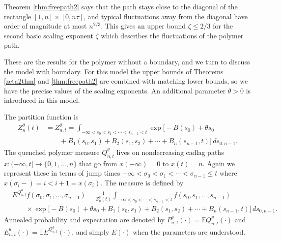\documentclass[11pt]{amsart}
\numberwithin{equation}{section}
\theoremstyle{remark}
\begin{document}
Theorem \ref{thm:freepath2} says that the path   stays close to the diagonal of the rectangle
$[1,n]\times[0,n\tau]$, and typical  fluctuations away from the diagonal have order of
magnitude at most $n^{2/3}$.  This gives an upper bound $\zeta\le 2/3$ for the second
basic scaling exponent $\zeta$  which describes the fluctuations of the polymer path. 

\medskip

These are the results for the polymer without a boundary, and we turn to discuss
the model with boundary.  For this model the upper bounds of Theorems 
\ref{zeta2thm} and \ref{thm:freepath2} are combined with matching lower bounds,
so we have the precise values of the scaling exponents.    An additional 
  parameter ${\theta}>0$ is introduced in this model.  
 
The partition function is 
\begin{equation}\begin{aligned} Z_{n}^{\theta}(t) &= Z^{\theta}_{n,t} =
\int_{-\infty<s_{0}<s_1<\dotsm<s_{n-1}<t}  \exp\bigl[ -B(s_0)+{\theta} s_0 \\[7pt]
 &\qquad  +  B_1(s_0,s_1) 
+B_{2}(s_1,s_{2}) +\dotsm + B_n(s_{n-1},t)\bigr] \,ds_{0,n-1}.
\end{aligned}\label{Zdef2}\end{equation}
 The quenched polymer measure $Q^{\theta}_{n,t}$
lives on    nondecreasing cadlag paths    
  $x:(-\infty,t]\to\{0,1,\dotsc,n\}$ that go from $x(-\infty)=0$ to $x(t)=n$.  Again 
we represent these     in terms of  jump times 
 $-\infty<\sigma_0<\sigma_1<\dotsm<\sigma_{n-1}\le t $ {where}
$x(\sigma_i-) = i< i+1=x(\sigma_i)$.  
The   measure is defined   by 
\begin{equation}\begin{aligned} 
&E^{Q^{\theta}_{n,t}}f(\sigma_0,\sigma_1,\dotsc,\sigma_{n-1})  
=\frac1{Z_{n}^{\theta}(t) } 
\int_{-\infty<s_{0}<\dotsm<s_{n-1}<t}  f(s_0, s_1,\dotsc, s_{n-1}) 
 \\[7pt]
 &\qquad  \times  \exp\bigl[ -B(s_0)+{\theta} s_0 +  B_1(s_0,s_1) 
+B_{2}(s_1,s_{2}) +\dotsm + B_n(s_{n-1},t)\bigr] \,ds_{0,n-1}.
\end{aligned}\label{Qdef2}\end{equation}
Annealed probability and expectation are   denoted by  
$P^{\theta}_{n,t}(\cdot)={\mathbb{E}} Q^{\theta}_{n,t}(\cdot)$  and 
 $E^{\theta}_{n,t}(\cdot)={\mathbb{E}} E^{Q^{\theta}_{n,t}}(\cdot)$, and simply
 $E(\cdot)$ when the parameters are understood. 
 
 \medskip
 
\end{document}
